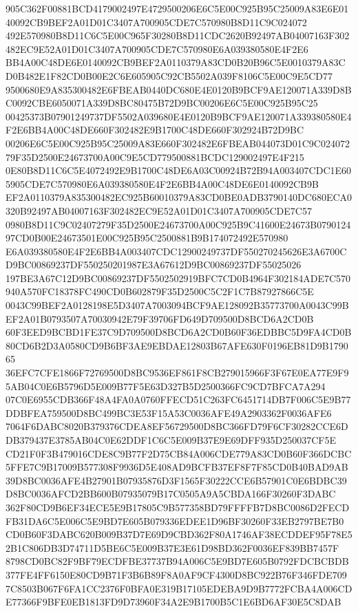 \documentclass[UTF8,fontset=fandol,zihao=-4,a4paper]{ctexart}
\begin{document}
{{905C362F00881BCD4179002497E4729500206E6C5E00C925B95C25009A83E6E0140092CB9BEF2A01D01C3407A700905CDE7C570980B8D11C9C024072
492E570980B8D11C6C5E00C965F30280B8D11CDC2620B92497AB04007163F302482EC9E52A01D01C3407A700905CDE7C570980E6A039380580E4F2E6
BB4A00C48DE6E0140092CB9BEF2A0110379A83CD0B20B96C5E0010379A83CD0B482E1F82CD0B00E2C6E605905C92CB5502A039F8106C5E00C9E5CD77
9500680E9A835300482E6FBEAB0440DC680E4E0120B9BCF9AE120071A339D8BC0092CBE6050071A339D8BC80475B72D9BC00206E6C5E00C925B95C25
00425373B07901249737DF5502A039680E4E0120B9BCF9AE120071A339380580E4F2E6BB4A00C48DE660F302482E9B1700C48DE660F302924B72D9BC
00206E6C5E00C925B95C25009A83E660F302482E6FBEAB044073D01C9C02407279F35D2500E24673700A00C9E5CD779500881BCDC129002497E4F215
0E80B8D11C6C5E4072492E9B1700C48DE6A03C00924B72B94A003407CDC1E605905CDE7C570980E6A039380580E4F2E6BB4A00C48DE6E0140092CB9B
EF2A0110379A835300482EC925B60010379A83CD0BE0ADB3790140DC680ECA0320B92497AB04007163F302482EC9E52A01D01C3407A700905CDE7C57
0980B8D11C9C02407279F35D2500E24673700A00C925B9C41600E24673B079012497CD0B00E24673501E00C925B95C2500881B9B174072492E570980
E6A039380580E4F2E6BB4A003407CDC12900249737DF550270245626E3A6700CD9BC00869237DF550250201987E3A67612D9BC00869237DF55025026
197BE3A67C12D9BC00869237DF5502502919BFC7CD0B4964F302184ADE7C570940A570FC18378FC490CD0B602879F35D2500C5C2F1C7B87927866C5E
0043C99BEF2A0128198E5D3407A7003094BCF9AE128092B35773700A0043C99BEF2A01B0793507A70030942E79F39706FD649D709500D8BCD6A2CD0B
60F3EED9BCBD1FE37C9D709500D8BCD6A2CD0B60F36EDBBC5D9FA4CD0B80CD6B2D3A0580CD9B6BF3AE9EBDAE12803B67AFE630F0196EB81D9B179065
36EFC7CFE1866F72769500D8BC9536EF861F8CB279015966F3F67E0EA77E9F95AB04C0E6B5796D5E009B77F5E63D327B5D2500366FC9CD7BFCA7A294
07C0E6955CDB366F48A4FA0A0760FFECD51C263FC6451714DB7F006C5E9B77DDBFEA759500D8BC499BC3E53F15A53C0036AFE49A2903362F0036AFE6
7064F6DABC8020B379376CDEA8EF56729500D8BC366FD79F6CF30282CCE6DDB379437E3785AB04C0E62DDF1C6C5E009B37E9E69DFF935D250037CF5E
CD21F0F3B479016CDE8C9B77F2D75CB84A006CDE779A83CD0B60F366DCBC5FFE7C9B17009B577308F9936D5E408AD9BCFB37EF8F7F85CD0B40BAD9AB
39D8BC0036AFE4B27901B07935876D3F1565F30222CCE6B57901C0E6BDBC39D8BC0036AFCD2BB600B07935079B17C0505A9A5CBDA166F30260F3DABC
362F80CD9B6EF34ECE5E9B17805C9B577358BD79FFFFB7D8BC0086D2FECDFB31DA6C5E006C5E9BD7E605B079336EDEE1D96BF30260F33EB2797BE7B0
CD0B60F3DABC620B009B37D7E69D9CBD362F80A1746AF38ECDDEF95F78E52B1C806DB3D74711D5BE6C5E009B37E3E61D98BD362F0036EF839BB7457F
8798CD0BC82F9BF79ECDFBE37737B94A006C5E9BD7E605B0792FDCBCBDB377FE4FF6150E80CD9B71F3B6B89F8A0AF9CF4300D8BC922B76F346FDE709
7C8503B067F6FA1CC2376F0BFA0E319B17105EDEBA9D9B7772FCBA4A006CDE77366F9BFE0EB1813FD9D73960F34A2E9B1700B5C1E6BD6AF30E5C8DAB
}}
\end{document}
